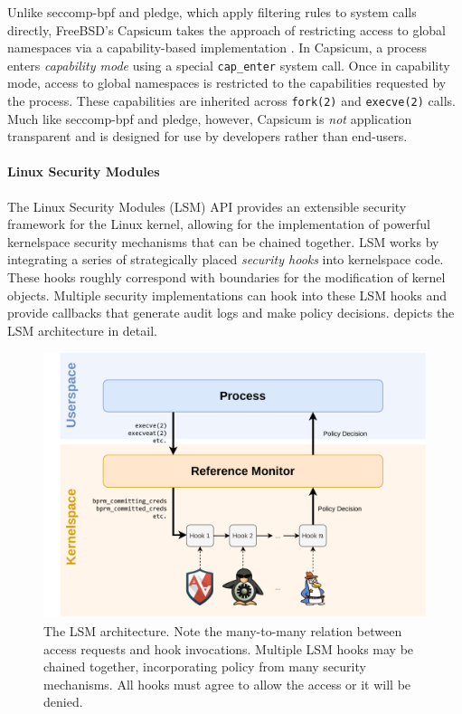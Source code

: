 Unlike seccomp-bpf and pledge, which apply filtering rules to system calls directly, FreeBSD's Capsicum takes the approach of restricting access to global namespaces via a capability-based implementation \cite{watson2010_capsicum}. In Capsicum, a process enters \textit{capability mode}  using a special \texttt{cap\_enter} system call. Once in capability mode, access to global namespaces is restricted to the capabilities requested by the process. These capabilities are inherited across \texttt{fork(2)} and \texttt{execve(2)} calls.  Much like seccomp-bpf and pledge, however, Capsicum is \textit{not} application transparent and is designed for use by developers rather than end-users.

\paragraph*{Linux Security Modules}

The Linux Security Modules (LSM) API \cite{wright2002_lsm} provides an extensible security framework for the Linux kernel, allowing for the implementation of powerful kernelspace security mechanisms that can be chained together. LSM works by integrating a series of strategically placed \textit{security hooks} into kernelspace code. These hooks roughly correspond with boundaries for the modification of kernel objects. Multiple security implementations can hook into these LSM hooks and provide callbacks that generate audit logs and make policy decisions.  depicts the LSM architecture in detail.

\begin{figure}[htb]
    \centering
    \includegraphics[width=0.8\linewidth]{figs/lsm.pdf}
    \caption{The LSM architecture. Note the many-to-many relation between access
    requests and hook invocations. Multiple LSM hooks may be chained together,
    incorporating policy from many security mechanisms. All hooks must agree to
    allow the access or it will be denied.}%
    \label{fig:lsm}
\end{figure}

